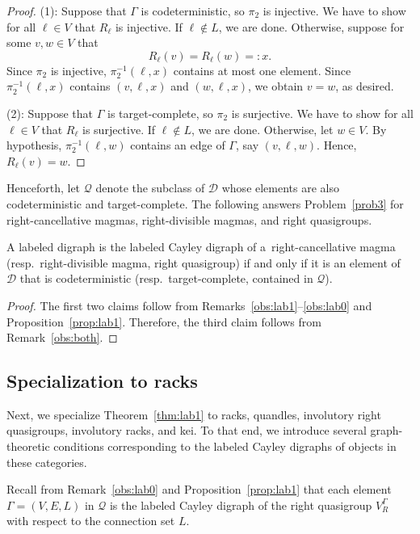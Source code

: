 \documentclass{jonasart}
\newcommand{\inv}{^{-1}}
\begin{document}
	\begin{proof}
		(1): Suppose that $\Gamma$ is codeterministic, so $\pi_2$ is injective. We have to show for all $\ell\in V$ that $R_\ell$ is injective. If $\ell\notin L$, we are done. Otherwise, suppose for some $v,w\in V$ that
		\[
			R_\ell(v)=R_\ell(w)=:x.
		\]
		Since $\pi_2$ is injective, $\pi_2\inv(\ell,x)$ contains at most one element. Since $\pi_2\inv(\ell,x)$ contains $(v,\ell,x)$ and $(w,\ell,x)$, we obtain $v=w$, as desired.

		(2): Suppose that $\Gamma$ is target-complete, so $\pi_2$ is surjective. We have to show for all $\ell\in V$ that $R_\ell$ is surjective. If $\ell\notin L$, we are done. Otherwise, let $w\in V$. By hypothesis, $\pi_2\inv(\ell,w)$ contains an edge of $\Gamma$, say $(v,\ell,w)$. Hence, $R_\ell(v)=w$.
	\end{proof}

	Henceforth, let $\mathcal{Q}$ denote the subclass of $\mathcal{D}$ whose elements are also codeterministic and target-complete. The following answers Problem~\ref{prob3} for right-cancellative magmas, right-divisible magmas, and right quasigroups.
	\begin{theorem}\label{thm:lab1}
		A labeled digraph is the labeled Cayley digraph of a~right-cancellative magma \textup{(}resp.\ right-divisible magma, right quasigroup\textup{)} if and only if it is an element of $\mathcal{D}$ that is codeterministic \textup{(}resp.\ target-complete, contained in $\mathcal{Q}$\textup{)}.
	\end{theorem}

	\begin{proof}
		The first two claims follow from Remarks~\ref{obs:lab1}--\ref{obs:lab0} and Proposition~\ref{prop:lab1}. Therefore, the third claim follows from Remark~\ref{obs:both}.
	\end{proof}

	\subsection{Specialization to racks}

	Next, we specialize Theorem~\ref{thm:lab1} to racks, quandles, involutory right quasigroups, involutory racks, and kei. To that end, we introduce several graph-theoretic conditions corresponding to the labeled Cayley digraphs of objects in these categories.

	Recall from Remark~\ref{obs:lab0} and Proposition~\ref{prop:lab1} that each element $\Gamma=(V,E,L)$ in $\mathcal{Q}$ is the labeled Cayley digraph of the right quasigroup $V^\Gamma_R$ with respect to the connection set $L$.
\end{document}
